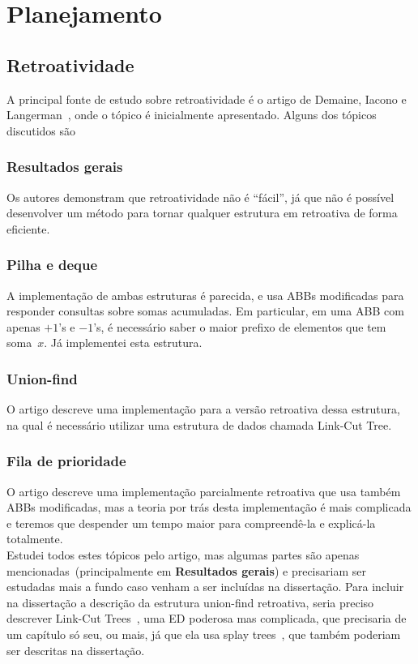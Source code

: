 \documentclass[quali.tex]{subfile}
\begin{document}
\section{Planejamento} \label{sec:planejamento}

\subsection{Retroatividade}

A principal fonte de estudo sobre retroatividade é o artigo de Demaine, Iacono e Langerman~\cite{DemaineIL2007}, onde o tópico é inicialmente apresentado. Alguns dos tópicos discutidos são

\subsubsection*{Resultados gerais}
	Os autores demonstram que retroatividade não é ``fácil'', já que não é possível desenvolver um método para tornar qualquer estrutura em retroativa de forma eficiente.
\subsubsection*{Pilha e deque}
	A implementação de ambas estruturas é parecida, e usa ABBs modificadas para responder consultas sobre somas acumuladas. Em particular, em uma ABB com apenas $+1$'s e $-1$'s, é necessário saber o maior prefixo de elementos que tem soma~$x$. Já implementei esta estrutura.
\subsubsection*{Union-find}
	O artigo descreve uma implementação para a versão retroativa dessa estrutura, na qual é necessário utilizar uma estrutura de dados chamada Link-Cut Tree.
\subsubsection*{Fila de prioridade}
	O artigo descreve uma implementação parcialmente retroativa que usa também ABBs modificadas, mas a teoria por trás desta implementação é mais complicada e teremos que despender um tempo maior para compreendê-la e explicá-la totalmente. \\

Estudei todos estes tópicos pelo artigo, mas algumas partes são apenas mencionadas~(principalmente em \textbf{Resultados gerais}) e precisariam ser estudadas mais a fundo caso venham a ser incluídas na dissertação. Para incluir na dissertação a descrição da estrutura union-find retroativa, seria preciso descrever Link-Cut Trees~\cite{SleatorT1981}, uma ED poderosa mas complicada, que precisaria de um capítulo só seu, ou mais, já que ela usa splay trees~\cite{SleatorT1985}, que também poderiam ser descritas na dissertação.
\end{document}
